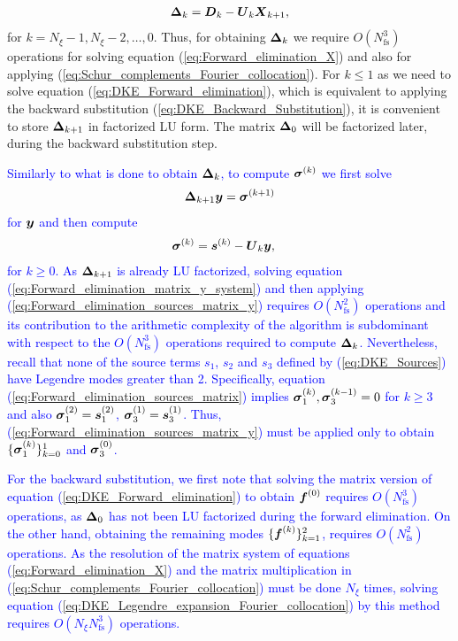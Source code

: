 %
\begin{align}
	\vb*{\Delta}_k = \vb*{D}_k - \vb*{U}_{k}\vb*{X}_{k+1}, 
	\label{eq:Schur_complements_Fourier_collocation}
\end{align}
for $k=N_\xi-1, N_\xi-2, \ldots, 0$. Thus, for obtaining $\vb*{\Delta}_k$ we require $O(N_{\text{fs}}^3)$ operations for solving equation (\ref{eq:Forward_elimination_X}) and also for applying (\ref{eq:Schur_complements_Fourier_collocation}). For $k\le 1$ as we need to solve equation (\ref{eq:DKE_Forward_elimination}), which is equivalent to applying the backward substitution (\ref{eq:DKE_Backward_Substitution}), it is convenient to store $\vb*{\Delta}_{k+1}$ in factorized LU form. The matrix $\vb*{\Delta}_{0}$ will be factorized later, during the backward substitution step.

\textcolor{blue}{	
Similarly to what is done to obtain $\vb*{\Delta}_k$, to compute $\vb*{\sigma}^{(k)}$ we first solve 
%
\begin{align}
	\vb*{\Delta}_{k+1} \vb*{y} = \vb*{\sigma}^{(k+1)}
	\label{eq:Forward_elimination_matrix_y_system}
\end{align}
for $\vb*{y}$ and then compute
%
\begin{align}
	\vb*{\sigma}^{(k)} & = \vb*{s}^{(k)} - \vb*{U}_{k}  \vb*{y},
	\label{eq:Forward_elimination_sources_matrix_y}
\end{align}
%
for $k\ge 0$. As $\vb*{\Delta}_{k+1}$ is already LU factorized, solving equation (\ref{eq:Forward_elimination_matrix_y_system}) and then applying (\ref{eq:Forward_elimination_sources_matrix_y}) requires $O(N_{\text{fs}}^2)$ operations and its contribution to the arithmetic complexity of the algorithm is subdominant with respect to the $O(N_{\text{fs}}^3)$ operations required to compute $\vb*{\Delta}_k$. Nevertheless, recall that none of the source terms $s_1$, $s_2$ and $s_3$ defined by (\ref{eq:DKE_Sources}) have Legendre modes greater than 2. Specifically, equation (\ref{eq:Forward_elimination_sources_matrix}) implies $\vb*{\sigma}_1^{(k)}, \vb*{\sigma}_3^{(k-1)} = 0$ for $k\ge 3$ and also $\vb*{\sigma}_1^{(2)} = \vb*{s}_1^{(2)}$, $\vb*{\sigma}_3^{(1)} = \vb*{s}_3^{(1)}$. Thus, (\ref{eq:Forward_elimination_sources_matrix_y}) must be applied only to obtain $\{\vb*{\sigma}_1^{(k)}\}_{k=0}^{1}$ and $\vb*{\sigma}_3^{(0)}$.}

\textcolor{blue}{
For the backward substitution, we first note that solving the matrix version of equation (\ref{eq:DKE_Forward_elimination}) to obtain $\vb*{f}^{(0)}$ requires $O(N_{\text{fs}}^3)$ operations, as $\vb*{\Delta}_0$ has not been LU factorized during the forward elimination. On the other hand, obtaining the remaining modes  $\{\vb*{f}^{(k)}\}_{k=1}^{2}$, requires $O(N_{\text{fs}}^2)$ operations. As the resolution of the matrix system of equations (\ref{eq:Forward_elimination_X}) and the matrix multiplication in (\ref{eq:Schur_complements_Fourier_collocation}) must be done $N_\xi$ times, solving equation (\ref{eq:DKE_Legendre_expansion_Fourier_collocation}) by this method requires $O(N_\xi N_{\text{fs}}^3)$ operations. }

